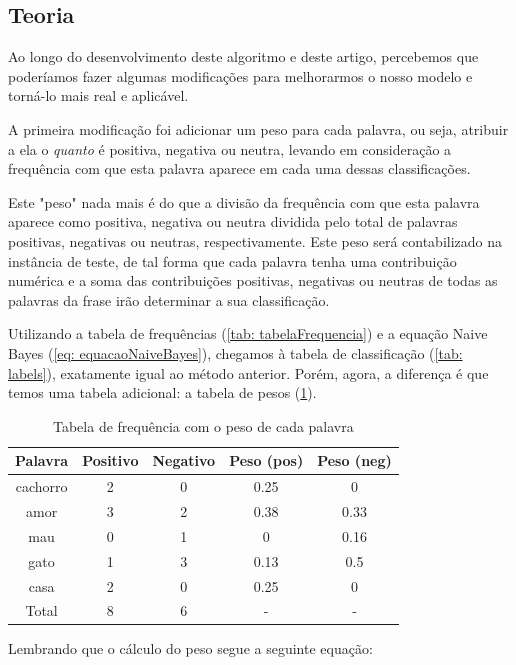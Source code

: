 \documentclass[
article,			%
12pt,				%
a4paper,			%
english,			%
brazil,				%
sumario=tradicional,
twoside
]{abntex2}
\begin{document}
	\subsection{Teoria}
	Ao longo do desenvolvimento deste algoritmo e deste artigo, percebemos que poderíamos fazer algumas modificações para melhorarmos o nosso modelo e torná-lo mais real e aplicável.
	
	A primeira modificação foi adicionar um peso para cada palavra, ou seja, atribuir a ela o \emph{quanto} é positiva, negativa ou neutra, levando em consideração a frequência com que esta palavra aparece em cada uma dessas classificações. 
	
	Este "peso"  nada mais é do que a divisão da frequência com que esta palavra aparece como positiva, negativa ou neutra dividida pelo total de palavras positivas, negativas ou neutras, respectivamente. Este peso será contabilizado na instância de teste, de tal forma que cada palavra tenha uma contribuição numérica e a soma das contribuições positivas, negativas ou neutras de todas as palavras da frase irão determinar a sua classificação.
	
	
	Utilizando a tabela de frequências (\ref{tab: tabelaFrequencia}) e a equação Naive Bayes (\ref{eq: equacaoNaiveBayes}), chegamos à tabela de classificação (\ref{tab: labels}), exatamente igual ao método anterior. Porém, agora, a diferença é que temos uma tabela adicional: a tabela de pesos (\ref{tab: tabfreq2}).
 
	\begin{table}[!h]
		\caption{Tabela de frequência com o peso de cada palavra}
		\label{tab: tabfreq2}
		\centering
		
		\begin{tabular}{|c|c|c|c|c|} \hline
			\textbf{Palavra} & \textbf{Positivo} & \textbf{Negativo} & \textbf{Peso (pos)} & \textbf{Peso (neg)}\\
			\hline
			cachorro & 2 & 0 & 0.25 & 0\\
			amor & 3 & 2 & 0.38 & 0.33\\
			mau & 0 & 1 & 0 & 0.16\\
			gato & 1 & 3 & 0.13 & 0.5\\
			casa & 2 & 0 & 0.25 & 0\\
			\hline
			Total & 8 & 6  & - & - \\
			\hline
			
		\end{tabular}
	\end{table}

    Lembrando que o cálculo do peso segue a seguinte equação:
	
\end{document}

